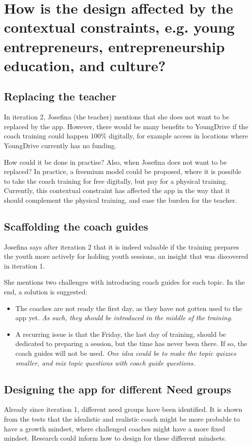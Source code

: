 \section{How is the design affected by the contextual constraints, e.g. young entrepreneurs, entrepreneurship education, and culture?}

\subsection{Replacing the teacher}
In iteration 2, Josefina (the teacher) mentions that she does not want to be replaced by the app. However, there would be many benefits to YoungDrive if the coach training could happen 100\% digitally, for example access in locations where YoungDrive currently has no funding.

How could it be done in practise? Also, when Josefina does not want to be replaced? In practice, a freemium model could be proposed, where it is possible to take the coach training for free digitally, but pay for a physical training. Currently, this contextual constraint has affected the app in the way that it should complement the physical training, and ease the burden for the teacher.

\subsection{Scaffolding the coach guides}
Josefina says after iteration 2 that it is indeed valuable if the training prepares the youth more actively for holding youth sessions, an insight that was discovered in iteration 1.

She mentions two challenges with introducing coach guides for each topic. In the end, a solution is suggested:
\begin{itemize}
\item The coaches are not ready the first day, as they have not gotten used to the app yet. \textit{As such, they should be introduced in the middle of the training.}
\item A recurring issue is that the Friday, the last day of training, should be dedicated to preparing a session, but the time has never been there. If so, the coach guides will not be used. \textit{One idea could be to make the topic quizzes smaller, and mix topic questions with coach guide questions.}
\end{itemize}

\subsection{Designing the app for different Need groups}
Already since iteration 1, different need groups have been identified. It is shown from the tests that the idealistic and realistic coach might be more probable to have a growth mindset, where challenged coaches might have a more fixed mindset. Research could inform how to design for these different mindsets.

